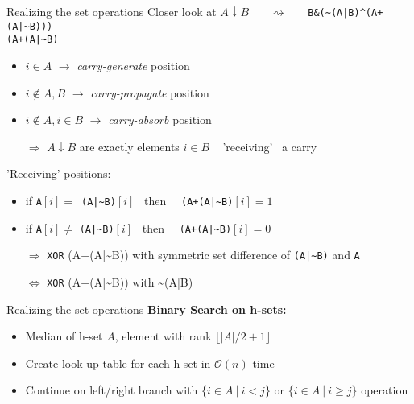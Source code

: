 \documentclass[18pt]{beamer}
\begin{document}
 \begin{frame}{Realizing the set operations}
 	Closer look at $A \downarrow B$ \ \ \ $\rightsquigarrow$ \ \ \  \texttt{B\&(\textasciitilde(A|B)\^{}(A+(A|\textasciitilde B)))} \\
 	\bigskip 
 	{\color{blue} \texttt{(A+(A|\textasciitilde B)}}
 	\begin{itemize}
 		\item $i \in A$ $\rightarrow$ \emph{carry-generate} position
 		\item $i \notin A,B$ $\rightarrow$ \emph{carry-propagate} position
 		\item $i \notin A, i \in B$ $\rightarrow$ \emph{carry-absorb} position
 		\item [$\Rightarrow$] $A \downarrow B$ are exactly elements $i \in B$ \ {\color{blue} 'receiving'} \ a carry
 	\end{itemize}
 	\bigskip
 	\pause
    'Receiving' positions:
    \begin{itemize}
    	\item if \texttt{A}$[i] = $\ \texttt{(A|\textasciitilde B)}$[i]$ \ then \ \ \texttt{(A+(A|\textasciitilde B)}$[i] = 1$
    	\item if \texttt{A}$[i] \neq$ \texttt{(A|\textasciitilde B)}$[i]$ \ then \ \ \texttt{(A+(A|\textasciitilde B)}$[i] = 0$
    	\item [$\Rightarrow$] \texttt{XOR} (A+(A|\textasciitilde B)) with symmetric set difference of \texttt{(A|\textasciitilde B)} and \texttt{A}
    	\item [$\Leftrightarrow$] \texttt{XOR} (A+(A|\textasciitilde B)) with \textasciitilde(A|B)
    \end{itemize}
\end{frame}
\begin{frame}{Realizing the set operations}
	\textbf{Binary Search on h-sets:}
	\begin{itemize}
		\item Median of h-set $A$, element with rank $\lfloor|A|/2 + 1\rfloor$
		\item Create look-up table for each h-set in $\mathcal{O}(n)$ time
		\item Continue on left/right branch with $\{i \in A \ | \ i < j\}$ or $\{i \in A  \ | \ i \ge j\}$ operation
	\end{itemize}
\end{frame}
\end{document}
